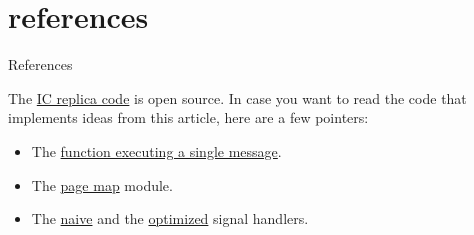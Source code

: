 \documentclass{article}
\begin{document}
\section{references}{References}

The \href{https://github.com/dfinity/ic}{IC replica code} is open source.
In case you want to read the code that implements ideas from this article, here are a few pointers:
\begin{itemize}
  \item The \href{https://github.com/dfinity/ic/blob/3633026472367a413912bf797490c9336ba762f5/rs/execution_environment/src/hypervisor.rs#L1136}{function executing a single message}.
  \item The \href{https://github.com/dfinity/ic/blob/3633026472367a413912bf797490c9336ba762f5/rs/replicated_state/src/page_map.rs}{page map} module.
  \item The \href{https://github.com/dfinity/ic/blob/3633026472367a413912bf797490c9336ba762f5/rs/memory_tracker/src/lib.rs#L358}{naive} and the \href{https://github.com/dfinity/ic/blob/3633026472367a413912bf797490c9336ba762f5/rs/memory_tracker/src/lib.rs#L499}{optimized} signal handlers.
\end{itemize}
\end{document}

